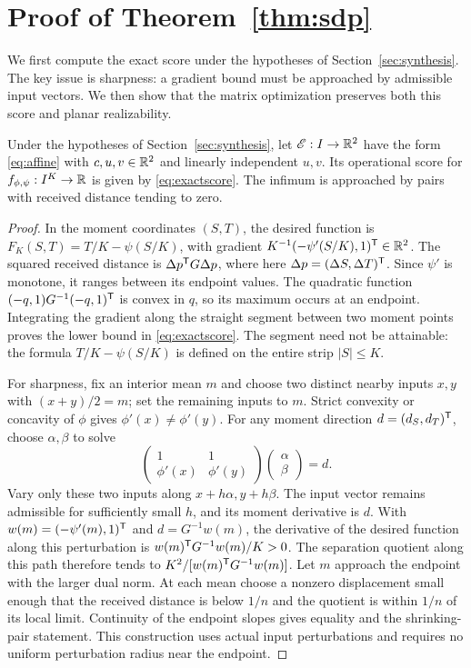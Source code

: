 \section{Proof of Theorem~\ref{thm:sdp}}\label{app:design-proof}
We first compute the exact score under the hypotheses of Section~\ref{sec:synthesis}. The key issue is sharpness: a gradient bound must be approached by admissible input vectors. We then show that the matrix optimization preserves both this score and planar realizability.

\begin{proposition}
\label{prop:score}
Under the hypotheses of Section~\ref{sec:synthesis}, let $\mathscr E:I\to\mathbb R^2$ have the form \eqref{eq:affine} with $c,u,v\in\mathbb R^2$ and linearly independent $u,v$. Its operational score for $f_{\phi,\psi}:I^K\to\mathbb R$ is given by \eqref{eq:exactscore}.
The infimum is approached by pairs with received distance tending to zero.
\end{proposition}
\begin{proof}
In the moment coordinates $(S,T)$, the desired function is $F_K(S,T)=T/K-\psi(S/K)$, with gradient $K^{-1}(-\psi'(S/K),1)^\mathsf T\in\mathbb R^2$. The squared received distance is $\Delta p^\mathsf T G\Delta p$, where here $\Delta p=(\Delta S,\Delta T)^\mathsf T$. Since $\psi'$ is monotone, it ranges between its endpoint values. The quadratic function $(-q,1)G^{-1}(-q,1)^\mathsf T$ is convex in $q$, so its maximum occurs at an endpoint. Integrating the gradient along the straight segment between two moment points proves the lower bound in \eqref{eq:exactscore}. The segment need not be attainable: the formula $T/K-\psi(S/K)$ is defined on the entire strip $|S|\le K$.

For sharpness, fix an interior mean $m$ and choose two distinct nearby inputs $x,y$ with $(x+y)/2=m$; set the remaining inputs to $m$. Strict convexity or concavity of $\phi$ gives $\phi'(x)\ne\phi'(y)$. For any moment direction $d=(d_S,d_T)^\mathsf T$, choose $\alpha,\beta$ to solve
$$
 \begin{pmatrix}1&1\\\phi'(x)&\phi'(y)\end{pmatrix}
 \begin{pmatrix}\alpha\\\beta\end{pmatrix}=d.
$$
Vary only these two inputs along $x+h\alpha,y+h\beta$. The input vector remains admissible for sufficiently small $h$, and its moment derivative is $d$. With $w(m)=(-\psi'(m),1)^\mathsf T$ and $d=G^{-1}w(m)$, the derivative of the desired function along this perturbation is $w(m)^\mathsf T G^{-1}w(m)/K>0$. The separation quotient along this path therefore tends to $K^2/[w(m)^\mathsf T G^{-1}w(m)]$. Let $m$ approach the endpoint with the larger dual norm. At each mean choose a nonzero displacement small enough that the received distance is below $1/n$ and the quotient is within $1/n$ of its local limit. Continuity of the endpoint slopes gives equality and the shrinking-pair statement. This construction uses actual input perturbations and requires no uniform perturbation radius near the endpoint.
\end{proof}
